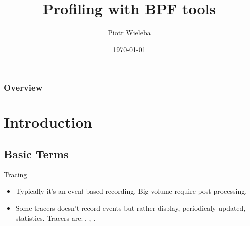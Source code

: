 \documentclass{beamer}
\title[BFP Tools]{Profiling with BPF tools} %
\author{Piotr Wieleba} %
\institute[DataArt] %
{
DataArt\\ %
\medskip
\textit{piotr.wieleba@dataart.com} %
}
\date{\today} %
\begin{document}
\begin{frame}
\titlepage %
\end{frame}


\begin{frame}
\frametitle{Overview} %
\tableofcontents %
\end{frame}


\section{Introduction} %
\subsection{Basic Terms}

\begin{frame}
  \begin{block}{Tracing}
    \begin{itemize}
      \item<1-> Typically it's an event-based recording.  Big volume require post-processing.
      \item<2-> Some tracers doesn't record events but rather display, periodicaly updated, statistics. Tracers are: , , . 
    \end{itemize}
  \end{block}
\end{frame}
\end{document}
